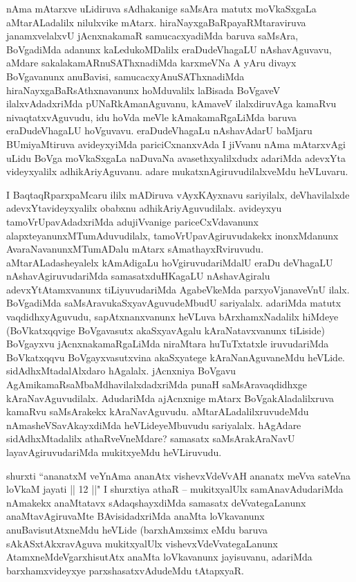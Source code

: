 \begin{artha}
nAma mAtarxve uLidiruva sAdhakanige saMsAra matutx moVkaSxgaLa aMtarALa\-dalilx nilulxvike mAtarx. hiraNayxgaBaRpayaRMtaraviruva janamxvelalxvU jAcnxnakamaR \-samucacxyadiMda baruva saMsAra, BoVgadiMda adanunx kaLedukoMDalilx eraDu\-deVhagaLU nAshavAguvavu, aMdare sakalakamARnuSAThxnadiMda karxmeVNa A yAru divayx BoVgavanunx anuBavisi, samucacxyAnuSAThxnadiMda hiraNayxgaBaRsAthxnavanunx hoMduvalilx laBisada BoVgaveV ilalxvAdadxriMda pUNaRkAmanAguvanu, kAmaveV ilalxdiruvAga kamaRvu nivaqtatxvAguvudu, idu hoVda meVle kAmakamaR\-gaLiMda baruva eraDudeVhagaLU hoVguvavu. eraDudeVhagaLu nAshavAdarU baMjaru BUmiyaMtiruva avideyxyiMda pariciCxnanxvAda I jiVvanu nAma mAtarxvAgi \-uLidu BoVga moVkaSxgaLa naDuvaNa avasethxyalilxdudx adariMda adevxYta videyxyalilx adhikAriyAguvanu. adare mukatxnAgiruvudilalxveMdu heVLuvaru.
\end{artha}

\begin{artha}
I BaqtaqRparxpaMcaru ililx mADiruva vAyxKAyxnavu sariyilalx, deVhavilalxde \-adevxYtavideyxyalilx obabxnu adhikAriyAguvudilalx. avideyxyu tamoVrUpavAdadx\-riMda adujiVvanige pariceCxVdavanunx alapxteyanunxMTumAduvudilalx, tamoVrUpa\-vAgiruvudakekx inonxMdanunx AvaraNavanunxMTumADalu mAtarx sAmathayxR\-viruvudu. aMtarALadasheyalelx kAmAdigaLu hoVgiruvudariMdalU eraDu deVhagaLU nAsha\-vAgiruvudariMda samasatxduHKagaLU nAshavAgiralu adevxYtAtamxvanunx tiLiyuvuda\-riMda AgabeVkeMda parxyoVjanaveVnU ilalx. BoVgadiMda saMsAravukaSxyavAguvu\-deMbudU sariyalalx. adariMda matutx vaqdidhxyAguvudu, sapAtxnanxvanunx heVLuva bArxhamxNadalilx hiMdeye (BoVkatxqqvige BoVgavasutx akaSxyavAgalu kAraNatavxvanunx tiLi\-side) BoVgayxvu jAcnxnakamaRgaLiMda niraMtara huTuTxtatxle iruvudariMda BoVkatxqqvu BoVgayxvasutxvina akaSxyatege kAraNanAguvaneMdu heVLide. sidAdhxMtadalAlxdaro \-hAgalalx. jAcnxniya BoVgavu AgAmikamaRsaMbaMdhavilalxdadxriMda punaH saMsAra\-vaqdidhxge kAraNavAguvudilalx. AdudariMda ajAcnxnige mAtarx BoVgakAladalilxruva \-kamaRvu saMsArakekx kAraNavAguvudu. aMtarALadalilxruvudeMdu nAmasheVSavAkayx\-diMda heVLideyeMbuvudu sariyalalx. hAgAdare sidAdhxMtadalilx athaRveVneMdare? samasatx saMsArakAraNavU layavAgiruvudariMda mukitxyeMdu heVLiruvudu.
\end{artha}

\begin{artha}
shurxti ``ananatxM veYnAma ananAtx vishevxVdeVvAH ananatx meVva sateVna loVkaM jayati || 12 ||" I shurxtiya athaR --  mukitxyalUlx samAnavAdudariMda nAmakekx anaMtatavx sAdaqshayxdiMda samasatx deVvategaLanunx anaMtavAgiruvaMte BAvisidadxriMda anaMta loVkavanunx anuBavisutAtxneMdu heVLide (barxhAmxsimx eMdu baruva sAkASxtAkxravAguva mukitxyalUlx vishevxVdeVvategaLanunx AtamxneMdeVgarxhisutAtx anaMta loVkavanunx jayisuvanu, adariMda barxhamxvideyxye parxshasatxvAdudeMdu tAtapxyaR.
\end{artha}

